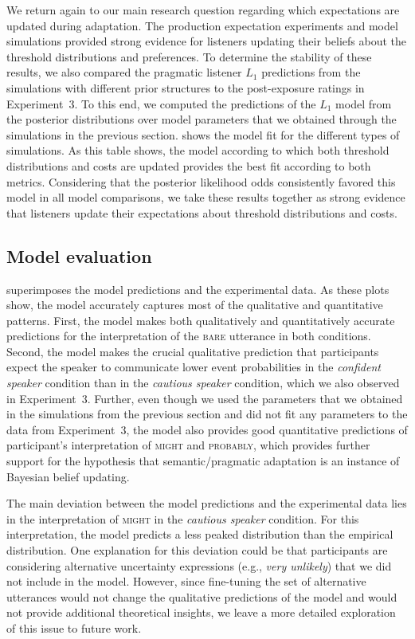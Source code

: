 We return again to our main research question regarding which expectations are updated during adaptation. The production expectation experiments and model simulations provided strong evidence for listeners updating 
their beliefs about the threshold distributions and preferences. 
To determine the stability of these results, we also compared the pragmatic listener $L_1$ predictions from the simulations with different prior structures to the post-exposure ratings in Experiment~3. To this end, we computed the predictions of the $L_1$ model from the
posterior distributions over model parameters that we obtained through the simulations in the previous section.  shows the model fit
for the different types of simulations. As this table shows, the model according to which both threshold distributions and costs are updated provides the best fit according to both metrics. 
Considering that the posterior likelihood odds consistently favored this model in all model comparisons, we take these results together as strong evidence that listeners update their expectations about threshold distributions
and costs. 

\subsection{Model evaluation}


 superimposes the model predictions and the experimental data. As these plots show, the model accurately captures most of the qualitative and quantitative patterns. First, 
the model makes both qualitatively and quantitatively accurate predictions for the interpretation of the \textsc{bare} utterance in both conditions. Second, the model makes the crucial qualitative prediction that participants expect the speaker to communicate lower event probabilities in the \textit{confident speaker} condition than in the \textit{cautious speaker} condition, which we also observed in Experiment~3. Further, even though we used the parameters that we obtained in the simulations from the previous section and did not fit any parameters to the data from Experiment~3, the model also provides good quantitative predictions of participant's interpretation of \textsc{might} and \textsc{probably},
which provides further support for the hypothesis that semantic/pragmatic adaptation is an instance of Bayesian belief updating.

The main deviation between the model predictions and the experimental data lies in the interpretation of \textsc{might} in the \textit{cautious speaker} condition. For this interpretation, the model predicts a less peaked distribution than the empirical distribution.  One explanation for this deviation could be that participants are considering alternative uncertainty expressions (e.g., \textit{very unlikely}) that we did not include in the model.  However, since fine-tuning the set of alternative utterances would not change the qualitative predictions of the model and would not provide additional theoretical insights, we leave a more detailed exploration of this issue to future work. 

